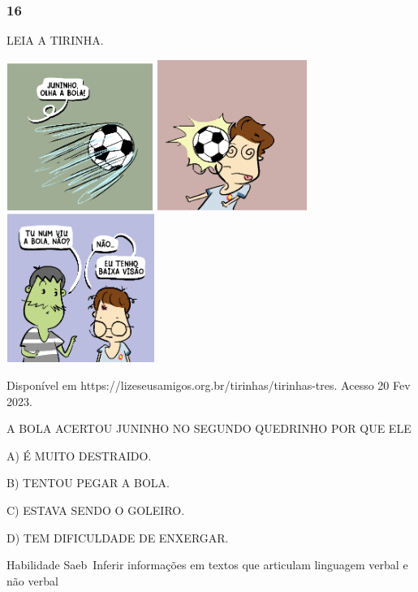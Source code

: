 \subsubsection{16}\label{section-72}

LEIA A TIRINHA.

\includegraphics[width=1.88542in,height=1.88542in]{media/image236.png}
\includegraphics[width=1.92708in,height=1.92708in]{media/image237.png}
\includegraphics[width=1.90625in,height=1.90625in]{media/image238.png}

Disponível em https://lizeseusamigos.org.br/tirinhas/tirinhas-tres.
Acesso 20 Fev 2023.

A BOLA ACERTOU JUNINHO NO SEGUNDO QUEDRINHO POR QUE ELE

A) É MUITO DESTRAIDO.

B) TENTOU PEGAR A BOLA.

C) ESTAVA SENDO O GOLEIRO.

D) TEM DIFICULDADE DE ENXERGAR.

Habilidade Saeb~Inferir informações em textos que articulam linguagem
verbal e não verbal

